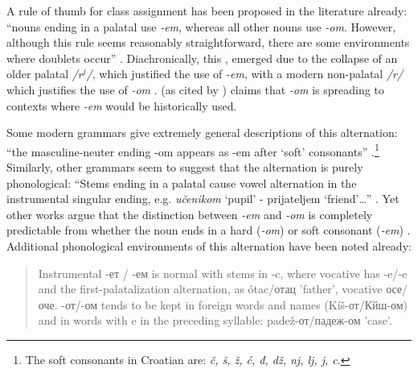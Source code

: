 \begin{exe}
    \ex \label{no-over-croat}
    \begin{xlist}
    \end{xlist}
\end{exe}


A rule of thumb for class assignment has been proposed in the literature already: ``nouns ending in a palatal  use \textit{-em}, whereas all other nouns use \textit{-om}. However, although this rule seems reasonably straightforward, there are some environments where  doublets occur'' \autocite[377]{Lecic.2015}. Diachronically, this  \autocites{Thornton.2011, Thornton.2010a}, emerged due to the collapse of an older palatal \textit{/r$^j$/}, which justified the use of \textit{-em}, with a modern non-palatal \textit{/r/} which justifies the use of \textit{-om} \autocite{Lecic.2015}. \textcite{Mladenovic.1977} (as cited by \citealt{Lecic.2015}) claims that \textit{-om} is spreading to contexts where \textit{-em} would be historically used.

Some modern grammars give extremely general descriptions of this alternation: ``the masculine-neuter ending -om appears as -em after `soft' consonants'' \autocite[85]{Alexander.2006}.\footnote{The soft consonants in Croatian are: \textit{č, š, ž, ć, đ, dž, nj, lj, j, c}.} Similarly, other grammars seem to suggest that the alternation is purely phonological: ``Stems ending in a palatal cause vowel alternation in the instrumental singular ending, e.g. \textit{učenik\emph{o}m} `pupil' - prijateljem `friend'\dots'' \autocite[12]{Kordic.1997}. Yet other works argue that the distinction between \textit{-em} and \textit{-om} is completely predictable from whether the noun ends in a hard (\textit{-om}) or soft consonant (\textit{-em}) \autocite[146]{Hammond.2005}. Additional phonological environments of this alternation have been noted already:

\begin{quotation}
Instrumental -ет / -ем is normal with  stems in -c, where vocative has -e/-e and the first-palatalization alternation, as ótac/отац 'father', vocative осе/оче. -от/-ом tends to be kept in foreign words and names (Kíš-от/Кйш-ом) and in words with e in the preceding syllable: padež-от/падеж-ом 'case'. \autocite[320]{Brown.1993}
\end{quotation}

